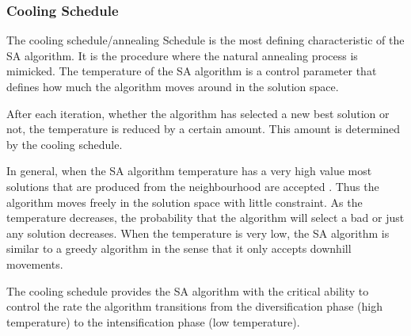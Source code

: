 \subsubsection{Cooling Schedule}
The cooling schedule/annealing Schedule is the most defining characteristic of the SA algorithm. It is the procedure where the natural annealing process is mimicked. The temperature of the SA algorithm is a control parameter that defines how much the algorithm moves around in the solution space.

After each iteration, whether the algorithm has selected a new best solution or not, the temperature is reduced by a certain amount. This amount is determined by the cooling schedule.

In general, when the SA algorithm temperature has a very high value most solutions that are produced from the neighbourhood are accepted \cite{ClusterSA}. Thus the algorithm moves freely in the solution space with little constraint. As the temperature decreases, the probability that the algorithm will select a bad or just any solution decreases. When the temperature is very low, the SA algorithm is similar to a greedy algorithm in the sense that it only accepts downhill movements\cite{ClusterSA}.

The cooling schedule provides the SA algorithm with the critical ability to control the rate the algorithm transitions from the diversification phase (high temperature) to the intensification phase (low temperature).

